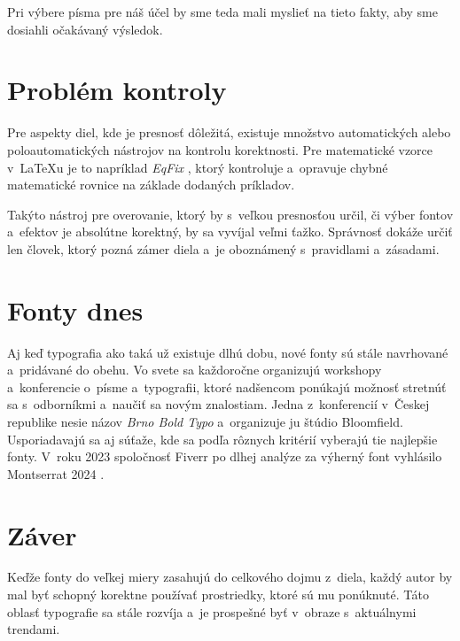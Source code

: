 \documentclass[a4paper, 11pt]{article}
\begin{document}
Pri výbere písma pre náš účel by sme teda mali myslieť na tieto fakty, aby sme dosiahli očakávaný výsledok.

\section{Problém kontroly}
Pre aspekty diel, kde je presnosť dôležitá, existuje množstvo automatických alebo poloautomatických nástrojov na kontrolu korektnosti. Pre matematické vzorce v~\LaTeX u je to napríklad
\emph{EqFix} \cite{DSET}, ktorý kontroluje a~opravuje chybné matematické rovnice na základe dodaných príkladov.

Takýto nástroj pre overovanie, ktorý by s~veľkou presnosťou určil, či výber fontov a~efektov je absolútne korektný, by sa vyvíjal veľmi ťažko. Správnosť dokáže určiť len človek, ktorý pozná zámer diela a~je oboznámený s~pravidlami a~zásadami.

\section{Fonty dnes}
Aj keď typografia ako taká už existuje dlhú dobu, nové fonty sú stále navrhované a~pridávané do obehu. Vo svete sa každoročne organizujú workshopy a~konferencie o~písme a~typografii, ktoré nadšencom
ponúkajú možnosť stretnúť sa s~odborníkmi a~naučiť sa novým znalostiam. Jedna z~konferencií v~Českej republike nesie názov \emph{Brno Bold Typo} \cite{Brno_bold_typo} a~organizuje ju štúdio Bloomfield.
Usporiadavajú sa aj súťaže, kde sa podľa rôznych kritérií vyberajú tie najlepšie fonty. V~roku 2023 spoločnosť Fiverr po dlhej analýze za výherný font vyhlásilo Montserrat 2024 \cite{Fiverr}.

\section*{Záver}
Keďže fonty do veľkej miery zasahujú do celkového dojmu z~diela, každý autor by mal byť schopný korektne používať prostriedky,
ktoré sú mu ponúknuté. Táto oblasť typografie sa stále rozvíja a~je prospešné byť v~obraze s~aktuálnymi trendami.
\newpage
\printbibliography
\end{document}
